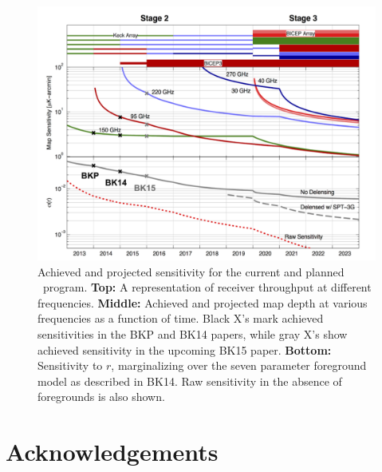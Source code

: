 \documentclass[]{spie}
\begin{document}
\begin{figure}[b]
\center
\includegraphics[scale=0.5]{projections.pdf}
\caption{Achieved and projected sensitivity for the current and planned \bk\
program. \textbf{Top:} A representation of receiver throughput at different
frequencies. \textbf{Middle:} Achieved and projected map depth at various
frequencies as a function of time. Black X's mark achieved sensitivities in the
BKP\cite{bkplanck} and BK14\cite{bk_vi} papers, while gray X's show achieved
sensitivity in the upcoming BK15 paper. \textbf{Bottom:} Sensitivity to $r$,
marginalizing over the seven parameter foreground model as described in BK14.
Raw sensitivity in the absence of foregrounds is also shown.}
\label{fig:projections}
\end{figure}










\section{Acknowledgements}
\end{document}
